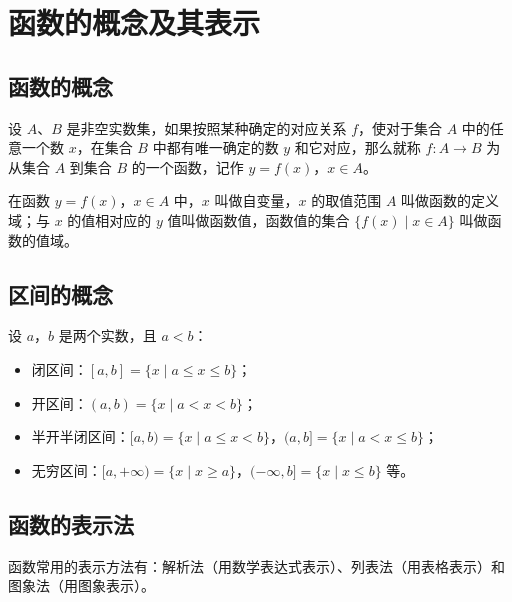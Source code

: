 
\section{函数的概念及其表示}
\subsection{函数的概念}
\begin{definition}[函数]
设 $A$、$B$ 是非空实数集，如果按照某种确定的对应关系 $f$，使对于集合 $A$ 中的任意一个数 $x$，在集合 $B$ 中都有唯一确定的数 $y$ 和它对应，那么就称 $f:A \to B$ 为从集合 $A$ 到集合 $B$ 的一个函数，记作 $y=f(x)$，$x \in A$。
\end{definition}
\begin{definition}[定义域与值域]
在函数 $y=f(x)$，$x \in A$ 中，$x$ 叫做自变量，$x$ 的取值范围 $A$ 叫做函数的定义域；与 $x$ 的值相对应的 $y$ 值叫做函数值，函数值的集合 $\{f(x) \mid x \in A\}$ 叫做函数的值域。
\end{definition}
\subsection{区间的概念}
\begin{definition}[区间]
设 $a$，$b$ 是两个实数，且 $a<b$：
\begin{itemize}
    \item 闭区间：$[a,b]=\{x \mid a \leq x \leq b\}$；
    \item 开区间：$(a,b)=\{x \mid a<x<b\}$；
    \item 半开半闭区间：$[a,b)=\{x \mid a \leq x<b\}$，$(a,b]=\{x \mid a<x \leq b\}$；
    \item 无穷区间：$[a,+\infty)=\{x \mid x \geq a\}$，$(-\infty,b]=\{x \mid x \leq b\}$ 等。
\end{itemize}
\end{definition}
\subsection{函数的表示法}
\begin{definition}[函数的表示法]
函数常用的表示方法有：解析法（用数学表达式表示）、列表法（用表格表示）和图象法（用图象表示）。
\end{definition}
